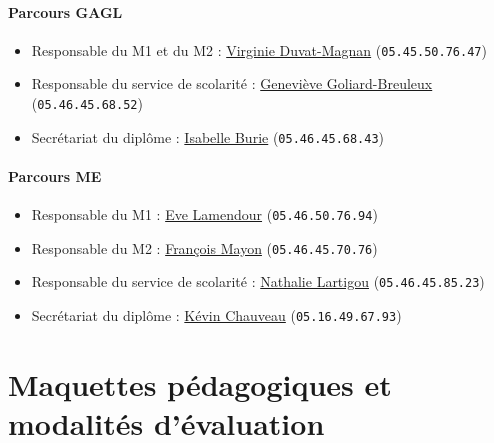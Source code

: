 \documentclass[a4paper,11pt]{article}
\begin{document}
\paragraph{Parcours GAGL}

\begin{itemize}
	\item Responsable du M1 et du M2 : \href{mailto:virginie.magnan@univ-lr.fr}{Virginie Duvat-Magnan} (\texttt{05.45.50.76.47})
	\item Responsable du service de scolarité : \href{mailto:genevieve.breuleux@univ-lr.fr}{Geneviève Goliard-Breuleux} (\texttt{05.46.45.68.52})
	\item Secrétariat du diplôme : \href{mailto:isabelle.burie@univ-lr.fr}{Isabelle Burie} (\texttt{05.46.45.68.43})
\end{itemize}

\paragraph{Parcours ME}

\begin{itemize}
	\item Responsable du M1 : \href{mailto:eve.lamendour@univ-lr.fr}{Eve Lamendour} (\texttt{05.46.50.76.94})
	\item Responsable du M2 : \href{mailto:francois.mayon@univ-lr.fr}{François Mayon} (\texttt{05.46.45.70.76})
	\item Responsable du service de scolarité : \href{mailto:nathalie.lartigou}{Nathalie Lartigou} (\texttt{05.46.45.85.23})
	\item Secrétariat du diplôme : \href{mailto:kevin.chauveau}{Kévin Chauveau} (\texttt{05.16.49.67.93})
\end{itemize}

\newpage

\section{Maquettes pédagogiques et modalités d'évaluation}\label{Maquette}
\end{document}
